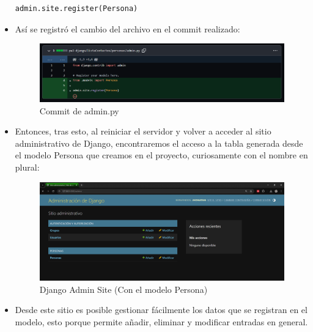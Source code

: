 \documentclass{article}
\begin{document}
\begin{itemize}
\begin{lstlisting}[language=Python, caption={Registro del modelo Persona}]
        admin.site.register(Persona)
        \end{lstlisting}
            \item Así se registró el cambio del archivo en el commit realizado:
        \begin{figure}[H]
            \centering
            \includegraphics[width=1\linewidth]{img/Commit4.png}
            \caption{Commit de admin.py}
            \label{fig:enter-label}
        \end{figure}
            \item Entonces, tras esto, al reiniciar el servidor y volver a acceder al sitio administrativo de Django, encontraremos el acceso a la tabla generada desde el modelo Persona que creamos en el proyecto, curiosamente con el nombre en plural:
        \begin{figure}[H]
            \centering
            \includegraphics[width=1\linewidth]{img/Admin_site2.png}
            \caption{Django Admin Site (Con el modelo Persona)}
            \label{fig:enter-label}
        \end{figure}
            \item Desde este sitio es posible gestionar fácilmente los datos que se registran en el modelo, esto porque permite añadir, eliminar y modificar entradas en general.
        \end{itemize}

\end{document}
